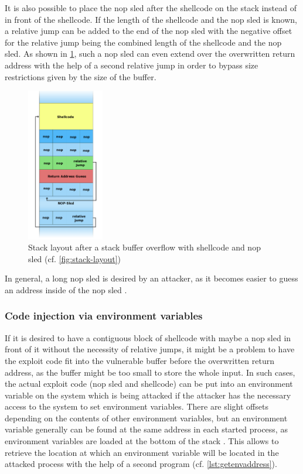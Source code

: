 It is also possible to place the \acrshort{nop} sled after the shellcode on the stack instead of in front of the shellcode.
If the length of the shellcode and the \acrshort{nop} sled is known, a relative jump can be added to the end of the \acrshort{nop} sled with the negative offset for the relative jump being the combined length of the shellcode and the \acrshort{nop} sled.
As shown in \cref{fig:stack-overflow-nop-sled}, such a \acrshort{nop} sled can even extend over the overwritten return address with the help of a second relative jump in order to bypass size restrictions given by the size of the buffer.

\begin{figure}[htb]
	\centering
	\includegraphics[width=0.3\textwidth]{figures/NopSled}
	\caption{Stack layout after a stack buffer overflow with shellcode and \acrshort{nop} sled \cite{Lynn2007c} (cf. \cref{fig:stack-layout})}
	\label{fig:stack-overflow-nop-sled}
\end{figure}

In general, a long \acrshort{nop} sled is desired by an attacker, as it becomes easier to guess an address inside of the \acrshort{nop} sled \cite{AlephOne1996}.

\subsubsection{Code injection via environment variables}
\label{subsubsec:ci-via-env-variable}

If it is desired to have a contiguous block of shellcode with maybe a \acrshort{nop} sled in front of it without the necessity of relative jumps, it might be a problem to have the exploit code fit into the vulnerable buffer before the overwritten return address, as the buffer might be too small to store the whole input.
In such cases, the actual exploit code (\acrshort{nop} sled and shellcode) can be put into an environment variable on the system which is being attacked if the attacker has the necessary access to the system to set environment variables.
There are slight offsets depending on the contents of other environment variables, but an environment variable generally can be found at the same address in each started process, as environment variables are loaded at the bottom of the stack \cite[731\psq]{Bryant2011}.
This allows to retrieve the location at which an environment variable will be located in the attacked process with the help of a second program (cf. \cref{lst:getenvaddress}).

